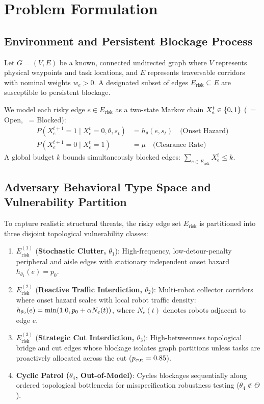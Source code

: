 \documentclass[lettersize,journal]{IEEEtran}
\begin{document}
\section{Problem Formulation}

\subsection{Environment and Persistent Blockage Process}
Let $G = (V, E)$ be a known, connected undirected graph where $V$ represents physical waypoints and task locations, and $E$ represents traversable corridors with nominal weights $w_e > 0$. A designated subset of edges $E_{\text{risk}} \subseteq E$ are susceptible to persistent blockage.

We model each risky edge $e \in E_{\text{risk}}$ as a two-state Markov chain $X_e^t \in \{0, 1\}$ (\aeStateOpen\ = Open, \aeStateBlocked\ = Blocked):
\begin{align}
    P(X_e^{t+1} = 1 \mid X_e^t = 0, \theta, s_t) &= h_\theta(e, s_t) \quad \text{(Onset Hazard)} \\
    P(X_e^{t+1} = 0 \mid X_e^t = 1) &= \mu \quad \text{(Clearance Rate)}
\end{align}
A global budget $k$ bounds simultaneously blocked edges: $\sum_{e \in E_{\text{risk}}} X_e^t \le k$.

\subsection{Adversary Behavioral Type Space and Vulnerability Partition}
To capture realistic structural threats, the risky edge set $E_{\text{risk}}$ is partitioned into three disjoint topological vulnerability classes:
\begin{enumerate}
    \item $E_{\text{risk}}^{(1)}$ (\textbf{Stochastic Clutter, $\theta_1$}): High-frequency, low-detour-penalty peripheral and aisle edges with stationary independent onset hazard $h_{\theta_1}(e) = p_0$.
    \item $E_{\text{risk}}^{(2)}$ (\textbf{Reactive Traffic Interdiction, $\theta_2$}): Multi-robot collector corridors where onset hazard scales with local robot traffic density: $h_{\theta_2}(e) = \min(1.0, p_0 + \alpha N_e(t))$, where $N_e(t)$ denotes robots adjacent to edge $e$.
    \item $E_{\text{risk}}^{(3)}$ (\textbf{Strategic Cut Interdiction, $\theta_3$}): High-betweenness topological bridge and cut edges whose blockage isolates graph partitions unless tasks are proactively allocated across the cut ($p_{\text{cut}} = 0.85$).
    \item \textbf{Cyclic Patrol ($\theta_4$, Out-of-Model)}: Cycles blockages sequentially along ordered topological bottlenecks for misspecification robustness testing ($\theta_4 \notin \Theta$).
\end{enumerate}
\end{document}
